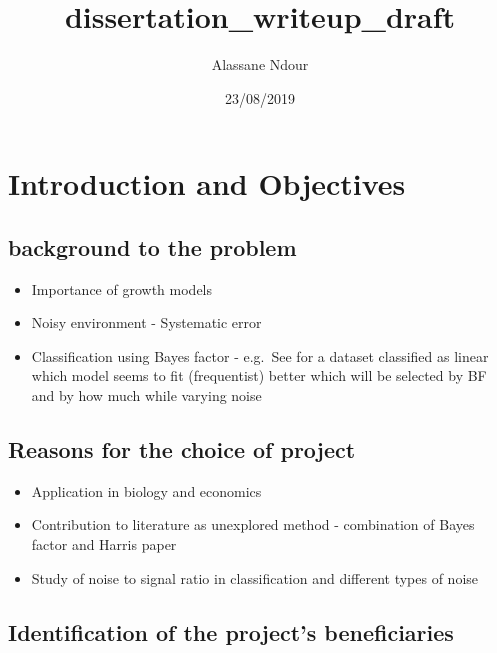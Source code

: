 \documentclass[]{article}
\title{dissertation\_writeup\_draft}
\author{Alassane Ndour}
\date{23/08/2019}
\providecommand{\tightlist}{%
  \setlength{\itemsep}{0pt}\setlength{\parskip}{0pt}}
\begin{document}
\maketitle

\hypertarget{introduction-and-objectives}{%
\section{Introduction and
Objectives}\label{introduction-and-objectives}}

\hypertarget{background-to-the-problem}{%
\subsection{background to the problem}\label{background-to-the-problem}}

\begin{itemize}
\tightlist
\item
  Importance of growth models
\item
  Noisy environment - Systematic error
\item
  Classification using Bayes factor - e.g.~See for a dataset classified
  as linear which model seems to fit (frequentist) better which will be
  selected by BF and by how much while varying noise
\end{itemize}

\hypertarget{reasons-for-the-choice-of-project}{%
\subsection{Reasons for the choice of
project}\label{reasons-for-the-choice-of-project}}

\begin{itemize}
\tightlist
\item
  Application in biology and economics
\item
  Contribution to literature as unexplored method - combination of Bayes
  factor and Harris paper
\item
  Study of noise to signal ratio in classification and different types
  of noise
\end{itemize}

\hypertarget{identification-of-the-projects-beneficiaries}{%
\subsection{Identification of the project's
beneficiaries}\label{identification-of-the-projects-beneficiaries}}
\end{document}

